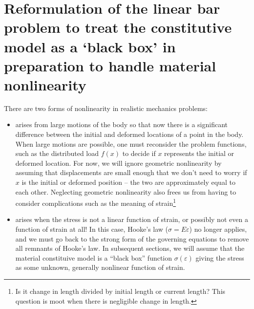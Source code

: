 
\section{Reformulation of the linear bar problem to treat the constitutive model as a `black box' in preparation to handle material nonlinearity}
There are two forms of nonlinearity in realistic mechanics problems: 
\begin{itemize}
  \item {} arises from large motions of the body so that now there is a significant difference between the initial and deformed locations of a point in the body. When large motions are possible, one must reconsider the problem functions, such as the distributed load $f(x)$ to decide if $x$ represents the initial or deformed location. For now, we will ignore geometric nonlinearity by assuming that displacements are small enough that we don't need to worry if $x$ is the initial or deformed position -- the two are approximately equal to each other. Neglecting geometric nonlinearity also frees us from having to consider complications such as the meaning of strain\footnote{Is it change in length divided by initial length or current length? This question is moot when there is negligible change in length.}
  \item {} arises when the stress is not a linear function of strain, or possibly not even a function of strain at all! In this case, Hooke's law ($\sigma=E\varepsilon$) no longer applies, and we must go back to the strong form of the governing equations to remove all remnants of Hooke's law. In subsequent sections, we will assume that the material constituive model is a ``black box'' function $\sigma(\varepsilon)$ giving the stress as some unknown, generally nonlinear function of strain.
\end{itemize}




